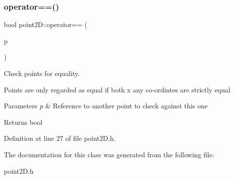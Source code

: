 \subsubsection{\texorpdfstring{operator==()}{operator==()}}
{\footnotesize\ttfamily bool point2\+D\+::operator== (\begin{DoxyParamCaption}\item[{const \mbox{\hyperlink{classpoint2D}{point2D}} \&}]{p }\end{DoxyParamCaption})\hspace{0.3cm}{\ttfamily [inline]}}



Check points for equality. 

Points are only regarded as equal if both x any co-\/ordintes are strictly equal


\begin{DoxyParams}{Parameters}
{\em p} & Reference to another point to check against this one \\
\hline
\end{DoxyParams}
\begin{DoxyReturn}{Returns}
bool 
\end{DoxyReturn}


Definition at line 27 of file point2\+D.\+h.



The documentation for this class was generated from the following file\+:\begin{DoxyCompactItemize}
\item 
point2\+D.\+h\end{DoxyCompactItemize}
